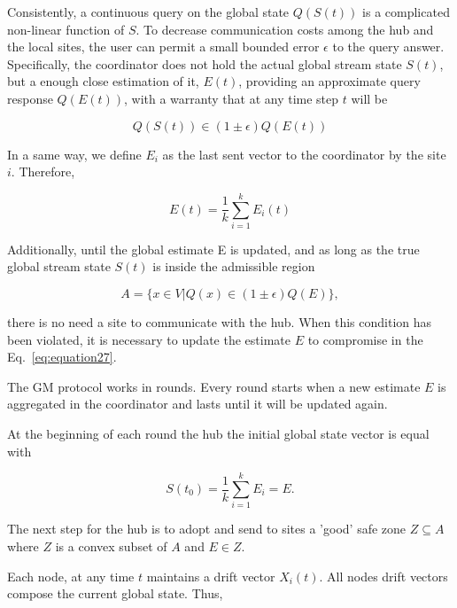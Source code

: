 Consistently, a continuous query on the global state $Q(S(t))$ is a complicated non-linear function of $S$.
To decrease communication costs among the hub and the local sites, the user can permit a small bounded error $\epsilon$ to the query answer.
Specifically, the coordinator does not hold the actual global stream state $S(t)$, but a enough close estimation of it, $E(t)$,
providing an approximate query response $Q(E(t))$, with a warranty that at any time step $t$ will be

\begin{equation}
    Q(S(t)) \in (1 \pm \epsilon) Q(E(t))\label{eq:equation27}
\end{equation}

In a same way, we define $E_i$ as the last sent vector to the coordinator by the site $i$.
Therefore,

\begin{equation}
    E(t) = \frac{1}{k} \sum_{i=1}^{k} E_i(t)\label{eq:equation28}
\end{equation}

Additionally, until the global estimate E is updated, and as long as the true global stream state $S(t)$ is inside the admissible region

\begin{equation}
    A = \{ x \in V | Q(x) \in (1 \pm \epsilon)Q(E) \} ,\label{eq:equation29}
\end{equation}

there is no need a site to communicate with the hub.
When this condition has been violated, it is necessary to update the estimate $E$ to compromise in the Eq.~\ref{eq:equation27}.

The GM protocol works in rounds.
Every round starts when a new estimate $E$ is aggregated in the coordinator and lasts until it will be updated again.

At the beginning of each round the hub the initial global state vector is equal with

\begin{equation}
    S(t_0) = \frac{1}{k} \sum_{i=1}^{k} E_i = E.\label{eq:equation30}
\end{equation}

The next step for the hub is to adopt and send to sites a 'good' safe zone $Z \subseteq A$ where $Z$ is a convex subset of $A$ and $E \in Z$.

Each node, at any time $t$  maintains a drift vector $X_i(t)$.
All nodes drift vectors compose the current global state.
Thus,

